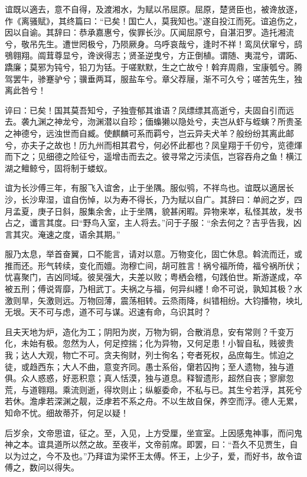 \documentclass[12pt,UTF8]{ctexbook}
\begin{document}
谊既以適去，意不自得，及渡湘水，为赋以吊屈原。屈原，楚贤臣也，被谗放逐，作《离骚赋》，其终篇曰：“已矣！国亡人，莫我知也。”遂自投江而死。谊追伤之，因以自谕。其辞曰：恭承嘉惠兮，俟罪长沙。仄闻屈原兮，自湛汨罗。造托湘流兮，敬吊先生。遭世罔极兮，乃陨厥身。乌呼哀哉兮，逢时不祥！鸾凤伏窜兮，鸱鴞翱翔。阘茸尊显兮，谗谀得志；贤圣逆曳兮，方正倒植。谓随、夷混兮，谓跖、蹻廉；莫邪为钝兮，铅刀为铦。于嗟默默，生之亡故兮！斡弃周鼎，宝康瓠兮。腾驾罢牛，骖蹇驴兮；骥垂两耳，服盐车兮。章父荐屦，渐不可久兮；嗟苦先生，独离此咎兮！



谇曰：已矣！国其莫吾知兮，子独壹郁其谁语？凤缥缥其高逝兮，夫固自引而远去。袭九渊之神龙兮，沕渊潜以自珍；偭蟂獭以隐处兮，夫岂从虾与蛭螾？所贵圣之神德兮，远浊世而自臧。使麒麟可系而羁兮，岂云异夫犬羊？般纷纷其离此邮兮，亦夫子之故也！历九州而相其君兮，何必怀此都也？凤皇翔于千仞兮，览德煇而下之；见细德之险征兮，遥增击而去之。彼寻常之污渎佤，岂容吞舟之鱼！横江湖之鳣鲸兮，固将制于蝼蚁。



谊为长沙傅三年，有服飞入谊舍，止于坐隅。服似鸮，不祥鸟也。谊既以適居长沙，长沙卑湿，谊自伤悼，以为寿不得长，乃为赋以自广。其辞曰：单阏之岁，四月孟夏，庚子日斜，服集余舍，止于坐隅，貌甚闲暇。异物来崒，私怪其故，发书占之，谶言其度。曰“野鸟入室，主人将去。”问于子服：“余去何之？吉乎告我，凶言其灾。淹速之度，语余其期。”



服乃太息，举首奋翼，口不能言，请对以意。万物变化，固亡休息。斡流而迁，或推而还。形气转续，变化而嬗。沕穆亡间，胡可胜言！祸兮福所倚，福兮祸所伏；忧喜聚门，吉凶同域。彼吴强大，夫差以败；粤栖会稽，句践伯世。斯游遂成，卒被五刑；傅说胥靡，乃相武丁。夫祸之与福，何异纠纆！命不可说，孰知其极？水激则旱，矢激则远。万物回薄，震荡相转。云烝雨降，纠错相纷。大钧播物，坱圠无垠。天不可与虑，道不可与谋。迟速有命，乌识其时？



且夫天地为炉，造化为工；阴阳为炭，万物为铜，合散消息，安有常则？千变万化，未始有极。忽然为人，何足控揣；化为异物，又何足患！小智自私，贱彼贵我；达人大观，物亡不可。贪夫徇财，列士徇名；夸者死权，品庶每生。怵迫之徒，或趋西东；大人不曲，意变齐同。愚士系俗，僒若囚拘；至人遗物，独与道俱。众人惑惑，好恶积意；真人恬漠，独与道息。释智遗形，超然自丧；寥廓忽荒，与道翱翔。乘流则逝，得坎则止；纵躯委命，不私与已。其生兮若浮，其死兮若休。澹虖若深渊之靓，泛虖若不系之舟。不以生故自保，养空而浮。德人无累，知命不忧。细故蒂芥，何足以疑！



后岁余，文帝思谊，征之。至，入见，上方受厘，坐宣室。上因感鬼神事，而问鬼神之本。谊具道所以然之故。至夜半，文帝前席。即罢，曰：“吾久不见贾生，自以为过之，今不及也。”乃拜谊为梁怀王太傅。怀王，上少子，爱，而好书，故令谊傅之，数问以得失。
\end{document}
